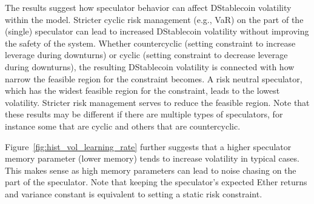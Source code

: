The results suggest how speculator behavior can affect DStablecoin volatility within the model. Stricter cyclic risk management (e.g., VaR) on the part of the (single) speculator can lead to increased DStablecoin volatility without improving the safety of the system. Whether countercyclic (setting constraint to increase leverage during downturns) or cyclic (setting constraint to decrease leverage during downturns), the resulting DStablecoin volatility is connected with how narrow the feasible region for the constraint becomes. A risk neutral speculator, which has the widest feasible region for the constraint, leads to the lowest volatility. Stricter risk management serves to reduce the feasible region. Note that these results may be different if there are multiple types of speculators, for instance some that are cyclic and others that are countercyclic.

Figure~\ref{fig:hist_vol_learning_rate} further suggests that a higher speculator memory parameter (lower memory) tends to increase volatility in typical cases. This makes sense as high memory parameters can lead to noise chasing on the part of the speculator. Note that keeping the speculator's expected Ether returns and variance constant is equivalent to setting a static risk constraint.

